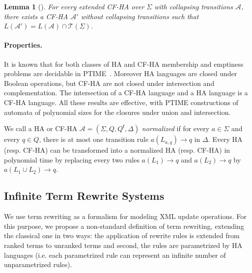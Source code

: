 \documentclass[a4paper]{article}
\newcommand{\remarque}[1]{}
\theoremstyle{plain}
\newtheorem{lemma}{Lemma}{\bfseries}{\itshape}
\newcommand{\T}{\mathcal{T}}
\newcommand{\F}{\Sigma}
\newcommand{\A}{\mathcal{A}}
\newcommand{\final}{\mathsf{f}}
\begin{document}
\begin{lemma}[\cite{JR-rta2008}] 
\label{lem:collapsing} \label{pr:collapse-HA} \label{pr:collapse-CFHA}
For every extended CF-HA over $\F$ with collapsing transitions $\A$, 
there exists a CF-HA $\A'$ without collapsing transitions such that 
$L(\A') = L(\A) \cap \T(\F)$.
\end{lemma}





\paragraph{Properties.}

It is known that for  both classes of HA and CF-HA
membership and emptiness problems are decidable in PTIME~\cite{Murata00,OhsakiST03}.
Moreover HA languages are closed under Boolean operations,
but CF-HA are not closed under intersection and complementation.
The intersection of a CF-HA language
and a HA language is a CF-HA language.
All these results are effective, with PTIME constructions of automata
of polynomial sizes for the closures under union and intersection.


\remarque{**RR** si pr. \S 3 sketched/suppr.}
We call a 
HA or CF-HA $\A = (\F, Q, Q^\final, \Delta)$ \emph{normalized} if
for every $a \in \F$ and every $q \in Q$, 
there is at most one transition rule $a(L_{a, q}) \to q$ in $\Delta$.
Every HA (resp. CF-HA) can be transformed into a normalized HA
(resp. CF-HA) in polynomial time
\label{page:normalization}
by replacing every two rules 
$a(L_1) \to q$ and $a(L_2) \to q$ by $a(L_1 \cup L_2) \to q$.
\remarque{**RR**}




















\subsection{Infinite Term Rewrite Systems} \label{sec:TRS}
We use term rewriting as a formalism for modeling XML update operations.
For this purpose, we propose a non-standard definition of term rewriting,
extending the classical one in two ways:
the application of rewrite rules is extended from ranked terms
to unranked terms and second,
the rules are parametrized by HA languages 
(i.e. each parametrized rule can represent an infinite number
 of unparametrized rules).
\end{document}
